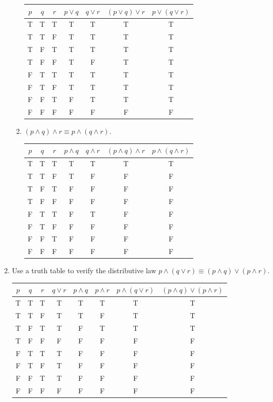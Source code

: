 \documentclass[11pt]{article}
\begin{document}
\begin{enumerate}[label=\textbf{\arabic*.}]
\begin{enumerate}[label=\textbf{\alph*)}]
		\begin{tabular}{c | c | c | c | c | c | c}
			$p$ & $q$ & $r$ & $p \lor q$ & $q \lor r$ & $(p \lor q) \lor r$ & $p \lor (q \lor r)$ \\
			\hline
			T & T & T & T & T & T & T \\
			T & T & F & T & T & T & T \\
			T & F & T & T & T & T & T \\
			T & F & F & T & F & T & T \\
			F & T & T & T & T & T & T \\
			F & T & F & T & T & T & T \\
			F & F & T & F & T & T & T \\
			F & F & F & F & F & F & F 
		\end{tabular}
		
		\item $(p \land q) \land r \equiv p \land (q \land r)$.
		
		\begin{tabular}{c | c | c | c | c | c | c}
			$p$ & $q$ & $r$ & $p \land q$ & $q \land r$ & $(p \land q) \land r$ & $p \land (q \land r)$ \\
			\hline
			T & T & T & T & T & T & T \\
			T & T & F & T & F & F & F \\
			T & F & T & F & F & F & F \\
			T & F & F & F & F & F & F \\
			F & T & T & F & T & F & F \\
			F & T & F & F & F & F & F \\
			F & F & T & F & F & F & F \\
			F & F & F & F & F & F & F 
		\end{tabular}
	\end{enumerate}

	\item Use a truth table to verify the distributive law $p \land (q \lor r) \equiv (p \land q) \lor (p \land r)$.
	
	\begin{tabular}{c | c | c | c | c | c | c | c}
		$p$ & $q$ & $r$ & $q \lor r$ & $p \land q$ & $p \land r$ & $p \land (q \lor r)$ & $(p \land q) \lor (p \land r)$ \\
		\hline
		T & T & T & T & T & T & T & T \\
		T & T & F & T & T & F & T & T \\
		T & F & T & T & F & T & T & T \\
		T & F & F & F & F & F & F & F \\
		F & T & T & T & F & F & F & F \\
		F & T & F & T & F & F & F & F \\
		F & F & T & T & F & F & F & F \\
		F & F & F & F & F & F & F & F
	\end{tabular}


\end{enumerate}
\end{document}
